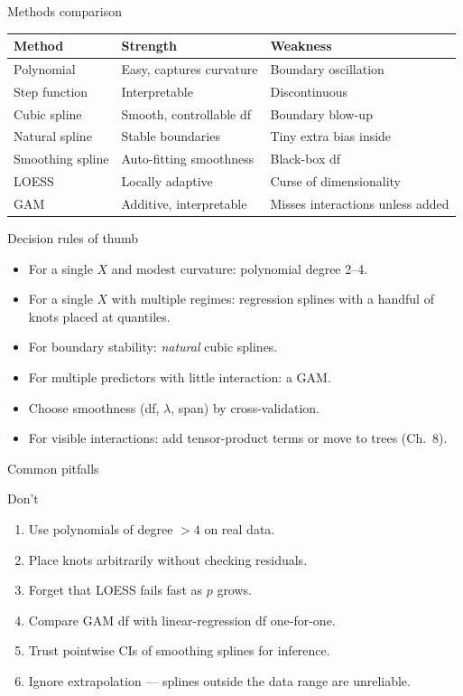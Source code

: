 \documentclass[aspectratio=169,11pt]{beamer}
\begin{document}
\begin{frame}{Methods comparison}
  \footnotesize
  \begin{tabular}{lll}
    \toprule
    \textbf{Method} & \textbf{Strength} & \textbf{Weakness} \\
    \midrule
    Polynomial & Easy, captures curvature & Boundary oscillation \\
    Step function & Interpretable & Discontinuous \\
    Cubic spline & Smooth, controllable df & Boundary blow-up \\
    Natural spline & Stable boundaries & Tiny extra bias inside \\
    Smoothing spline & Auto-fitting smoothness & Black-box df \\
    LOESS & Locally adaptive & Curse of dimensionality \\
    GAM & Additive, interpretable & Misses interactions unless added \\
    \bottomrule
  \end{tabular}
\end{frame}

\begin{frame}{Decision rules of thumb}
  \begin{itemize}
    \item For a single $X$ and modest curvature: polynomial degree
          2--4.
    \item For a single $X$ with multiple regimes: regression splines
          with a handful of knots placed at quantiles.
    \item For boundary stability: \emph{natural} cubic splines.
    \item For multiple predictors with little interaction: a GAM.
    \item Choose smoothness (df, $\lambda$, span) by cross-validation.
    \item For visible interactions: add tensor-product terms or move
          to trees (Ch.~8).
  \end{itemize}
\end{frame}

\begin{frame}{Common pitfalls}
  \begin{alertblock}{Don't}
    \begin{enumerate}
      \item Use polynomials of degree $> 4$ on real data.
      \item Place knots arbitrarily without checking residuals.
      \item Forget that LOESS fails fast as $p$ grows.
      \item Compare GAM df with linear-regression df one-for-one.
      \item Trust pointwise CIs of smoothing splines for inference.
      \item Ignore extrapolation --- splines outside the data range
            are unreliable.
    \end{enumerate}
  \end{alertblock}
\end{frame}
\end{document}
